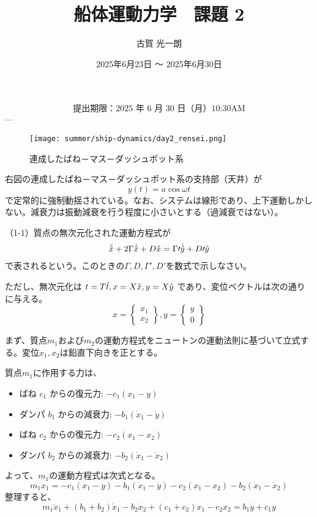 \documentclass[dvipdfmx,a4paper]{jsarticle}
\title{船体運動力学　課題 2}
\author{古賀 光一朗}
\date{2025年6月23日 ～ 2025年6月30日}
\begin{document}
\maketitle
$$\text{提出期限：2025 年 6 月 30 日（月）10:30AM}$$
---
\begin{wrapfigure}{r}{0.4\linewidth} %
\vspace{-20pt} %
\centering
\texttt{[image: summer/ship-dynamics/day2\_rensei.png]} 
\caption{連成したばね－マス－ダッシュポット系}
\label{fig:damper-system}
\end{wrapfigure}
右図の連成したばね－マス－ダッシュポット系の支持部（天井）が
\begin{equation}
 y(t)=a\cos{\omega t}
\end{equation}
で定常的に強制動揺されている。なお、システムは線形であり、上下運動しかしない。減衰力は振動減衰を行う程度に小さいとする（過減衰ではない）。

（1-1）質点の無次元化された運動方程式が
\begin{equation}
    \begin{gathered}\ddot{\hat x}+2\Gamma\dot{\hat x}+D\hat x=\Gamma\prime\dot{\hat y}+D\prime\hat y\end{gathered}\\
\end{equation}
で表されるという。このときの$\Gamma, D, \Gamma\prime,D\prime $を数式で示しなさい。


ただし、無次元化は $t=T\hat t , \space x=X\hat x, \space y=X\hat y$ であり、変位ベクトルは次の通りに与える。
$$x=\begin{Bmatrix}x_1\\x_2\end{Bmatrix},y=\begin{Bmatrix}y\\0\end{Bmatrix}$$


まず、質点$m_1$および$m_2$の運動方程式をニュートンの運動法則に基づいて立式する。変位$x_1, x_2$は鉛直下向きを正とする。

質点$m_1$に作用する力は、
\begin{itemize}
    \item ばね $c_1$ からの復元力: $-c_1 (x_1 - y)$
    \item ダンパ $b_1$ からの減衰力: $-b_1 (\dot{x}_1 - \dot{y})$
    \item ばね $c_2$ からの復元力: $-c_2 (x_1 - x_2)$
    \item ダンパ $b_2$ からの減衰力: $-b_2 (\dot{x}_1 - \dot{x}_2)$
\end{itemize}
よって、$m_1$の運動方程式は次式となる。
\begin{equation}
    m_1 \ddot{x}_1 = -c_1 (x_1 - y) - b_1 (\dot{x}_1 - \dot{y}) - c_2 (x_1 - x_2) - b_2 (\dot{x}_1 - \dot{x}_2)
\end{equation}
整理すると、
\begin{equation}
    m_1 \ddot{x}_1 + (b_1 + b_2) \dot{x}_1 - b_2 \dot{x}_2 + (c_1 + c_2) x_1 - c_2 x_2 = b_1 \dot{y} + c_1 y \label{eq:m1}
\end{equation}
\end{document}
